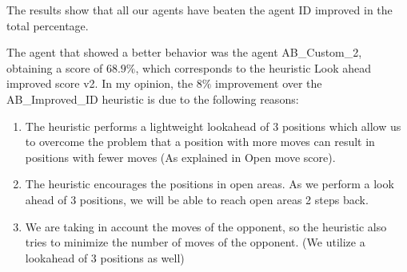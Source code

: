 \documentclass[10pt,a4paper]{article}
\begin{document}
The results show that all our agents have beaten the agent ID improved in the total percentage.\newline

The agent that showed a better behavior was the agent AB\_Custom\_2, obtaining a score of $68.9\%$, which corresponds to the heuristic Look ahead improved score v2. In my opinion, the $8\%$ improvement over the AB\_Improved\_ID heuristic is due to the following reasons:

\begin{enumerate}
\item The heuristic performs a lightweight lookahead of 3 positions which allow us to overcome the problem that a position with more moves can result in positions with fewer moves (As explained in Open move score).

\item The heuristic encourages the positions in open areas. As we perform a look ahead of 3 positions, we will be able to reach open areas 2 steps back.

\item We are taking in account the moves of the opponent, so the heuristic also tries to minimize the number of moves of the opponent. (We utilize a lookahead of 3 positions as well)
\end{enumerate}
\end{document}
